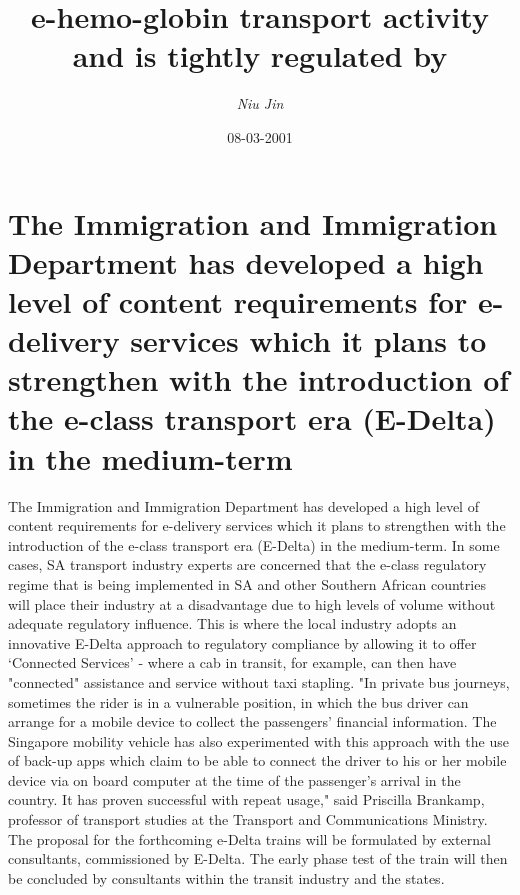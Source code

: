 \documentclass{article}%
\title{e{-}hemo{-}globin transport activity and is tightly regulated by}%
\author{\textit{Niu Jin}}%
\date{08-03-2001}%
\begin{document}
%
\normalsize%
\maketitle%
\section{The Immigration and Immigration Department has developed a high level of content requirements for e{-}delivery services which it plans to strengthen with the introduction of the e{-}class transport era (E{-}Delta) in the medium{-}term}%
\label{sec:TheImmigrationandImmigrationDepartmenthasdevelopedahighlevelofcontentrequirementsfore{-}deliveryserviceswhichitplanstostrengthenwiththeintroductionofthee{-}classtransportera(E{-}Delta)inthemedium{-}term}%
The Immigration and Immigration Department has developed a high level of content requirements for e{-}delivery services which it plans to strengthen with the introduction of the e{-}class transport era (E{-}Delta) in the medium{-}term.\newline%
In some cases, SA transport industry experts are concerned that the e{-}class regulatory regime that is being implemented in SA and other Southern African countries will place their industry at a disadvantage due to high levels of volume without adequate regulatory influence.\newline%
This is where the local industry adopts an innovative E{-}Delta approach to regulatory compliance by allowing it to offer ‘Connected Services' {-} where a cab in transit, for example, can then have "connected" assistance and service without taxi stapling.\newline%
"In private bus journeys, sometimes the rider is in a vulnerable position, in which the bus driver can arrange for a mobile device to collect the passengers' financial information. The Singapore mobility vehicle has also experimented with this approach with the use of back{-}up apps which claim to be able to connect the driver to his or her mobile device via on board computer at the time of the passenger's arrival in the country. It has proven successful with repeat usage," said Priscilla Brankamp, professor of transport studies at the Transport and Communications Ministry.\newline%
The proposal for the forthcoming e{-}Delta trains will be formulated by external consultants, commissioned by E{-}Delta. The early phase test of the train will then be concluded by consultants within the transit industry and the states.\newline%
\end{document}
